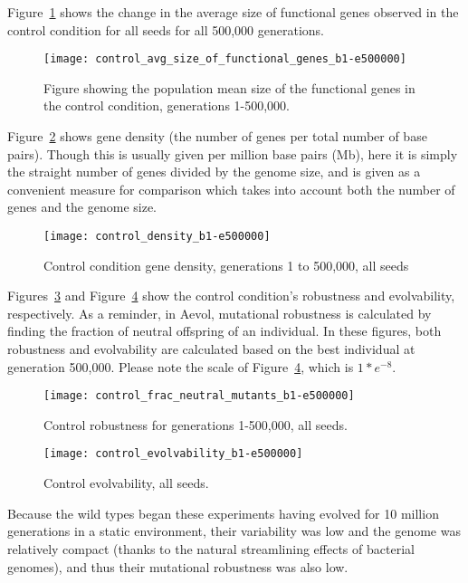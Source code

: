 Figure~\ref{fig:control_avg_size_of_functional_genes_b1-e500000} shows the change in the average size of functional genes observed in the control condition for all seeds for all 500,000 generations.  

\begin{figure}[h]
	\texttt{[image: control\_avg\_size\_of\_functional\_genes\_b1-e500000]}
	\caption[Control avg. size of functional genes]{Figure showing the population mean size of the functional genes in the control condition, generations 1-500,000.}
	\label{fig:control_avg_size_of_functional_genes_b1-e500000}
\end{figure}

Figure~\ref{fig:control_gene_density} shows gene density (the number of genes per total number of base pairs). Though this is usually given per million base pairs (Mb), here it is simply the straight number of genes divided by the genome size, and is given as a convenient measure for comparison which takes into account both the number of genes and the genome size. 

\begin{figure}[h]
	\centering
	\texttt{[image: control\_density\_b1-e500000]}
	\caption[Control gene density]{Control condition gene density, generations 1 to 500,000, all seeds}
	\label{fig:control_gene_density}
\end{figure}

Figures~\ref{fig:control_robustness} and Figure~\ref{fig:control_evolvability} show the control condition's robustness and evolvability, respectively. As a reminder, in Aevol, mutational robustness is calculated by finding the fraction of neutral offspring of an individual. In these figures, both robustness and evolvability are calculated based on the best individual at generation 500,000. Please note the scale of Figure~\ref{fig:control_evolvability}, which is $1*e^{-8}$.

\begin{figure}[h]
	\centering
	\texttt{[image: control\_frac\_neutral\_mutants\_b1-e500000]}
	\caption[Control robustness]{Control robustness for generations 1-500,000, all seeds.}
	\label{fig:control_robustness}
\end{figure}

\begin{figure}[h]
	\centering
	\texttt{[image: control\_evolvability\_b1-e500000]}
	\caption[Control evolvability]{Control evolvability, all seeds.}
	\label{fig:control_evolvability}
\end{figure}
Because the wild types began these experiments having evolved for 10 million generations in a static environment, their variability was low and the genome was relatively compact (thanks to the natural streamlining effects of bacterial genomes), and thus their mutational robustness was also low.

